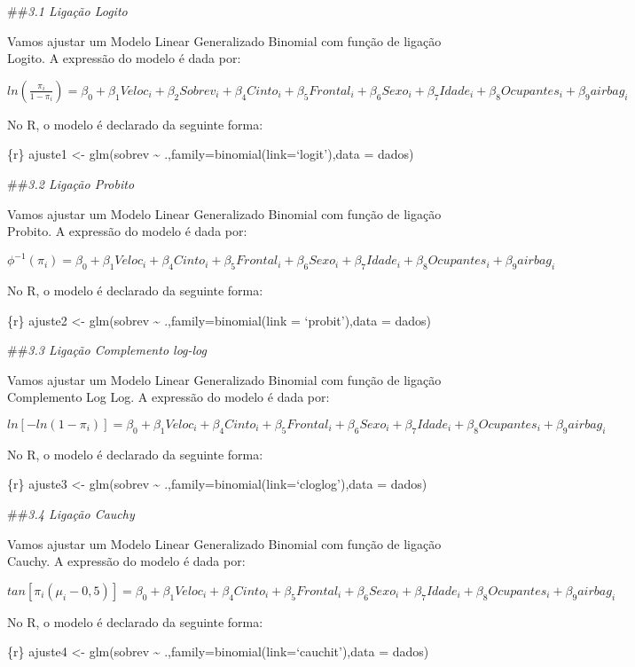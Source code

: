 \documentclass[
]{article}
\begin{document}
\#\#\emph{3.1 Ligação Logito}

Vamos ajustar um Modelo Linear Generalizado Binomial com função de
ligação Logito. A expressão do modelo é dada por:

\(ln (\frac{\pi_i}{1-\pi_i}) = \beta_0 + \beta_1 Veloc_i + \beta_2 Sobrev_i+ \beta_4 Cinto_i + \beta_5 Frontal_i + \beta_6 Sexo_i + \beta_7 Idade_i + \beta_8 Ocupantes_i + \beta_9 airbag_i\)

No R, o modelo é declarado da seguinte forma:

\{r\} ajuste1 \textless- glm(sobrev \textasciitilde{}
.,family=binomial(link=`logit'),data = dados)

\#\#\emph{3.2 Ligação Probito}

Vamos ajustar um Modelo Linear Generalizado Binomial com função de
ligação Probito. A expressão do modelo é dada por:

\(\phi^{-1} (\pi_i) = \beta_0 + \beta_1 Veloc_i + \beta_4 Cinto_i + \beta_5 Frontal_i + \beta_6 Sexo_i + \beta_7 Idade_i + \beta_8 Ocupantes_i + \beta_9 airbag_i\)

No R, o modelo é declarado da seguinte forma:

\{r\} ajuste2 \textless- glm(sobrev \textasciitilde{}
.,family=binomial(link = `probit'),data = dados)

\#\#\emph{3.3 Ligação Complemento log-log}

Vamos ajustar um Modelo Linear Generalizado Binomial com função de
ligação Complemento Log Log. A expressão do modelo é dada por:

\(ln[-ln(1-\pi_i)] = \beta_0 + \beta_1 Veloc_i + \beta_4 Cinto_i + \beta_5 Frontal_i + \beta_6 Sexo_i + \beta_7 Idade_i + \beta_8 Ocupantes_i + \beta_9 airbag_i\)

No R, o modelo é declarado da seguinte forma:

\{r\} ajuste3 \textless- glm(sobrev \textasciitilde{}
.,family=binomial(link=`cloglog'),data = dados)

\#\#\emph{3.4 Ligação Cauchy}

Vamos ajustar um Modelo Linear Generalizado Binomial com função de
ligação Cauchy. A expressão do modelo é dada por:

\(tan[\pi_i(\mu_i- 0,5)] = \beta_0 + \beta_1 Veloc_i + \beta_4 Cinto_i + \beta_5 Frontal_i + \beta_6 Sexo_i + \beta_7 Idade_i + \beta_8 Ocupantes_i + \beta_9 airbag_i\)

No R, o modelo é declarado da seguinte forma:

\{r\} ajuste4 \textless- glm(sobrev \textasciitilde{}
.,family=binomial(link=`cauchit'),data = dados)
\end{document}
